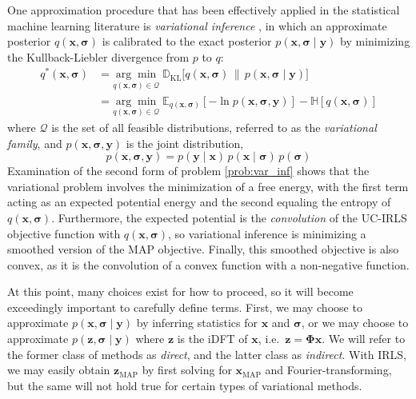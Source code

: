 \documentclass[final,5p,times,twocolumn]{elsarticle}
\newcommand{\m}[1]{\boldsymbol{#1}}
\newcommand{\E}[2]{\mathbb{E}_{#2}\left[ #1 \right]}
\newcommand{\entropy}[1]{\mathbb{H}\left[ #1 \right]}
\begin{document}
One approximation procedure that has been effectively applied in the
statistical machine learning literature is \emph{variational inference}
\cite{bishop2007}, in which an approximate posterior
$q(\m{x}, \m{\sigma})$ is calibrated to the exact posterior
$p(\m{x}, \m{\sigma} \mid \m{y})$ by minimizing the
Kullback-Liebler divergence from $p$ to $q$:
\begin{equation}
\begin{aligned}
q^*(\m{x}, \m{\sigma}) &=
 \underset{q(\m{x}, \m{\sigma}) \in \mathcal{Q}}{\arg\min} \;
 \mathbb{D}_{\text{KL}}\big[
  q(\m{x}, \m{\sigma}) \,\big\|\, p(\m{x}, \m{\sigma} \mid \m{y})
 \big]
\\ &=
 \underset{q(\m{x}, \m{\sigma}) \in \mathcal{Q}}{\arg\min} \;
 \E{-\ln p(\m{x}, \m{\sigma}, \m{y})}{q(\m{x}, \m{\sigma})} -
 \entropy{q(\m{x}, \m{\sigma})}
\end{aligned}
\label{prob:var_inf}
\end{equation}
where $\mathcal{Q}$ is the set of all feasible distributions, referred to
as the \emph{variational family}, and $p(\m{x}, \m{\sigma}, \m{y})$ is
the joint distribution,
\begin{equation}
p(\m{x}, \m{\sigma}, \m{y}) =
 p(\m{y} \mid \m{x}) \,
 p(\m{x} \mid \m{\sigma}) \,
 p(\m{\sigma})
\label{eq:joint}
\end{equation}
Examination of the second form of problem \eqref{prob:var_inf} shows
that the variational problem involves the minimization of a free
energy, with the first term acting as an expected potential energy
and the second equaling the entropy of $q(\m{x}, \m{\sigma})$.
Furthermore, the expected potential is the \emph{convolution} of
the UC-IRLS objective function with $q(\m{x}, \m{\sigma})$, so
variational inference is minimizing a smoothed version of the
MAP objective. Finally, this smoothed objective is also convex,
as it is the convolution of a convex function with a non-negative
function.

At this point, many choices exist for how to proceed, so it will become
exceedingly important to carefully define terms. First, we may choose to
approximate $p(\m{x}, \m{\sigma} \mid \m{y})$ by inferring statistics
for $\m{x}$ and $\m{\sigma}$, or we may choose to approximate
$p(\m{z}, \m{\sigma} \mid \m{y})$ where $\m{z}$ is the iDFT of $\m{x}$,
i.e.~$\m{z} = \m{\Phi} \m{x}$. We will refer to the former class of
methods as \emph{direct}, and the latter class as \emph{indirect}.
With IRLS, we may easily obtain $\m{z}_{\text{MAP}}$ by first solving
for $\m{x}_{\text{MAP}}$ and Fourier-transforming, but the same will
not hold true for certain types of variational methods.
\end{document}

